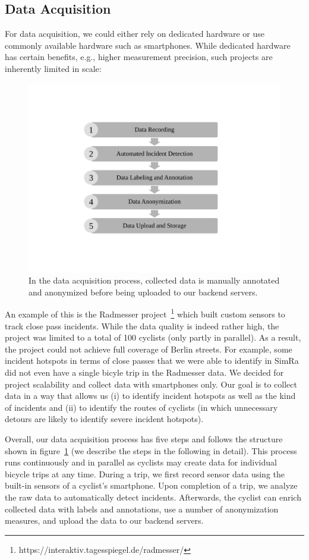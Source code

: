\subsection{Data Acquisition}
\label{subsec:data_acquisition}
For data acquisition, we could either rely on dedicated hardware or use commonly available hardware such as smartphones.
While dedicated hardware has certain benefits, e.g., higher measurement precision, such projects are inherently limited in scale:
\begin{figure}
    \center
    \includegraphics[width=0.5\columnwidth]{fig/data_acquisition_process.pdf}
    \caption{In the data acquisition process, collected data is manually annotated and anonymized before being uploaded to our backend servers.}
    \label{fig:data_acquisition_process}
\end{figure}
An example of this is the Radmesser project~\footnote{https://interaktiv.tagesspiegel.de/radmesser/} which built custom sensors to track close pass incidents.
While the data quality is indeed rather high, the project was limited to a total of 100 cyclists (only partly in parallel).
As a result, the project could not achieve full coverage of Berlin streets.
For example, some incident hotspots in terms of close passes that we were able to identify in SimRa did not even have a single bicyle trip in the Radmesser data.
We decided for project scalability and collect data with smartphones only.
Our goal is to collect data in a way that allows us (i) to identify incident hotspots as well as the kind of incidents and (ii) to identify the routes of cyclists (in which unnecessary detours are likely to identify severe incident hotspots).


Overall, our data acquisition process has five steps and follows the structure shown in figure~\ref{fig:data_acquisition_process} (we describe the steps in the following in detail).
This process runs continuously and in parallel as cyclists may create data for individual bicycle trips at any time.
During a trip, we first record sensor data using the built-in sensors of a cyclist's smartphone.
Upon completion of a trip, we analyze the raw data to automatically detect incidents.
Afterwards, the cyclist can enrich collected data with labels and annotations, use a number of anonymization measures, and upload the data to our backend servers.


